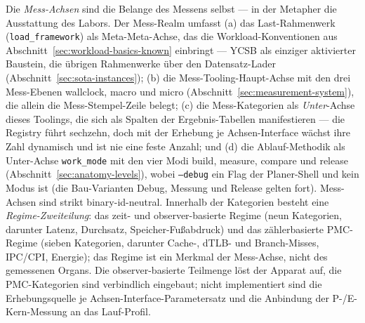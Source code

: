 \begin{nurkurz}
Die \emph{Mess-Achsen} sind die Belange des Messens selbst --- in der Metapher die Ausstattung des Labors. Der
Mess-Realm umfasst (a) das Last-Rahmenwerk (\texttt{load\_framework}) als Meta-Meta-Achse, das die
Workload-Konventionen aus Abschnitt~\ref{sec:workload-basics-known} einbringt --- YCSB als einziger aktivierter
Baustein, die übrigen Rahmenwerke über den Datensatz-Lader (Abschnitt~\ref{sec:sota-instances}); (b) die
Mess-Tooling-Haupt-Achse mit den drei Mess-Ebenen wallclock, macro und micro
(Abschnitt~\ref{sec:measurement-system}), die allein die Mess-Stempel-Zeile belegt; (c) die Mess-Kategorien als
\emph{Unter}-Achse dieses Toolings, die sich als Spalten der Ergebnis-Tabellen manifestieren --- die Registry
führt sechzehn, doch mit der Erhebung je Achsen-Interface wächst ihre Zahl dynamisch und ist nie eine feste
Anzahl; und (d) die Ablauf-Methodik als Unter-Achse \texttt{work\_mode} mit den vier Modi build, measure,
compare und release (Abschnitt~\ref{sec:anatomy-levels}), wobei \texttt{--debug} ein Flag der Planer-Shell
und kein Modus ist (die Bau-Varianten Debug, Messung und Release gelten fort). Mess-Achsen sind strikt
binary-id-neutral. Innerhalb
der Kategorien besteht eine \emph{Regime-Zweiteilung}: das zeit- und observer-basierte Regime (neun Kategorien,
darunter Latenz, Durchsatz, Speicher-Fußabdruck) und das zählerbasierte PMC-Regime (sieben Kategorien, darunter
Cache-, dTLB- und Branch-Misses, IPC/CPI, Energie); das Regime ist ein Merkmal der Mess-Achse, nicht des
gemessenen Organs. Die observer-basierte Teilmenge löst der Apparat auf, die PMC-Kategorien sind verbindlich
eingebaut; nicht implementiert sind die Erhebungsquelle je Achsen-Interface-Parametersatz und die Anbindung der
P-/E-Kern-Messung an das Lauf-Profil.
\end{nurkurz}

